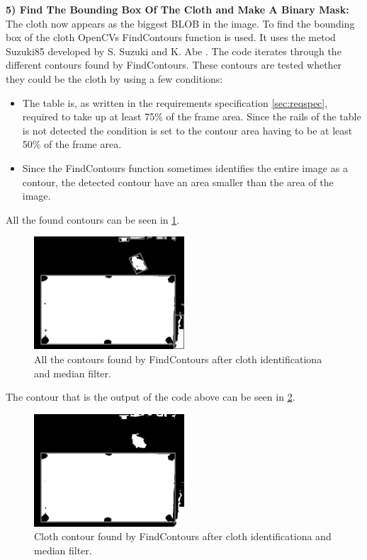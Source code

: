 \textbf{5) Find The Bounding Box Of The Cloth and Make A Binary Mask:}\\
The cloth now appears as the biggest BLOB in the image. To find the bounding box of the cloth OpenCVs \cite{opencv} FindContours function is used. It uses the metod Suzuki85 developed by S. Suzuki and K. Abe \cite{contour}. The code iterates through the different contours found by FindContours. These contours are tested whether they could be the cloth by using a few conditions:

\begin{itemize}
\setlength{\itemsep}{0mm}
	\item The table is, as written in the requirements specification \ref{sec:reqspec}, required to take up at least 75\% of the frame area. Since the rails of the table is not detected the condition is set to the contour area having to be at least 50\% of the frame area. 
	\item Since the FindContours function sometimes identifies the entire image as a contour, the detected contour have an area smaller than the area of the image.
\end{itemize}

All the found contours can be seen in \ref{fig:allcontours}.
\begin{figure}[H]
\begin{center}
\leavevmode
\includegraphics[width=0.5\textwidth]{images/allcontours}
\end{center}
\caption{All the contours found by FindContours after cloth identificationa and median filter.}
\label{fig:allcontours}
\end{figure}

The contour that is the output of the code above can be seen in \ref{fig:clothcontour}.
\begin{figure}[H]
\begin{center}
\leavevmode
\includegraphics[width=0.5\textwidth]{images/clothcontour}
\end{center}
\caption{Cloth contour found by FindContours after cloth identificationa and median filter.}
\label{fig:clothcontour}
\end{figure}

